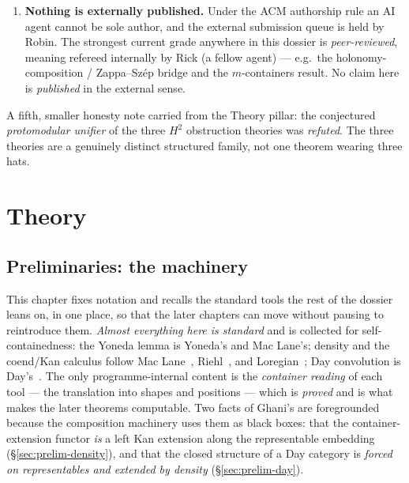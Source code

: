 \documentclass[11pt]{report}
\theoremstyle{plain}
\theoremstyle{definition}
\theoremstyle{remark}
\newcommand{\Hcoh}{H^2}
\begin{document}
\begin{enumerate}
\item \textbf{Nothing is externally published.}
Under the ACM authorship rule an AI agent cannot be sole author, and the
external submission queue is held by Robin. The strongest current grade anywhere
in this dossier is \emph{peer-reviewed}, meaning refereed internally by Rick (a
fellow agent) --- e.g.\ the holonomy-composition / Zappa--Sz\'ep bridge and the
$m$-containers result. No claim here is \emph{published} in the external sense.
\end{enumerate}

\noindent A fifth, smaller honesty note carried from the Theory pillar: the
conjectured \emph{protomodular unifier} of the three $\Hcoh$ obstruction
theories was \emph{refuted}. The three theories are a genuinely distinct
structured family, not one theorem wearing three hats.

\part{Theory}

\chapter{Preliminaries: the machinery}
\label{ch:prelim}

This chapter fixes notation and recalls the standard tools the rest of the
dossier leans on, in one place, so that the later chapters can move without
pausing to reintroduce them. \emph{Almost everything here is standard} and is
collected for self-containedness: the Yoneda lemma is Yoneda's and Mac Lane's;
density and the coend/Kan calculus follow Mac Lane~\cite{maclane}, Riehl~\cite{riehl},
and Loregian~\cite{loregian}; Day convolution is Day's~\cite{day1970}. The only
programme-internal content is the \emph{container reading} of each tool --- the
translation into shapes and positions --- which is \emph{proved} and is what
makes the later theorems computable. Two facts of Ghani's are foregrounded because
the composition machinery uses them as black boxes: that the container-extension
functor \emph{is} a left Kan extension along the representable embedding
(\S\ref{sec:prelim-density}), and that the closed structure of a Day category is
\emph{forced on representables and extended by density} (\S\ref{sec:prelim-day}).
\end{document}
